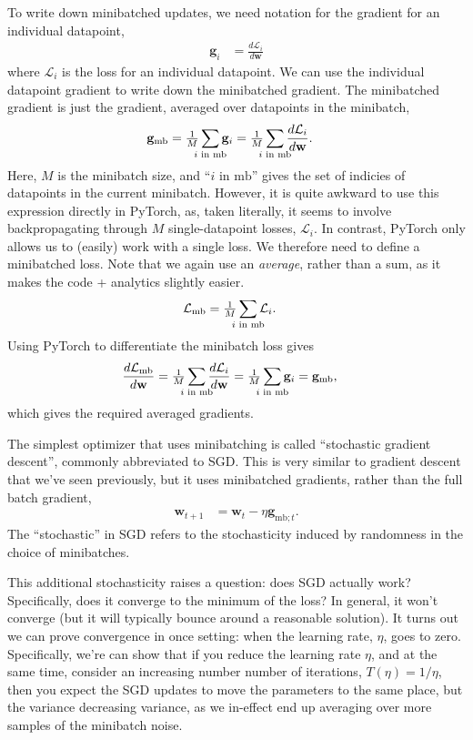 \documentclass{article}
\newcommand{\dt}[2][]{\frac{d #1}{d #2}}
\newcommand{\dLi}{\dt[{\Li}]}
\newcommand{\dLmb}{\dt[{\Lmb}]}
\newcommand{\0}{\mathbf{0}}
\newcommand{\g}{\mathbf{g}}
\newcommand{\gmb}{\g_\text{mb}}
\newcommand{\gmbt}{\g_{\text{mb}; t}}
\newcommand{\w}{\mathbf{w}}
\renewcommand{\L}{\mathcal{L}}
\newcommand{\Li}{\L_i}
\newcommand{\Lmb}{\L_\text{mb}}
\newcommand{\iinmb}{{i \text{ in mb}}}
\newcommand{\mbsize}{M}
\newcommand{\mbavg}{\tfrac{1}{\mbsize} \sum_{\mathclap{\iinmb}}}
\begin{document}
To write down minibatched updates, we need notation for the gradient for an individual datapoint,
\begin{align}
  \g_i &= \dLi{\w}
\end{align}
where $\Li$ is the loss for an individual datapoint.
We can use the individual datapoint gradient to write down the minibatched gradient. 
The minibatched gradient is just the gradient, averaged over datapoints in the minibatch,
\begin{align}
  \gmb &= \mbavg \g_i =  \mbavg \dLi{\w}.
\end{align}
Here, $\mbsize$ is the minibatch size, and ``$\iinmb$'' gives the set of indicies of datapoints in the current minibatch.
However, it is quite awkward to use this expression directly in PyTorch, as, taken literally, it seems to involve backpropagating through $M$ single-datapoint losses, $\Li$.
In contrast, PyTorch only allows us to (easily) work with a single loss.
We therefore need to define a minibatched loss.
Note that we again use an \textit{average}, rather than a sum, as it makes the code + analytics slightly easier.
\begin{align}
  \Lmb &= \mbavg \L_i.
\end{align}
Using PyTorch to differentiate the minibatch loss gives 
\begin{align}
  \dLmb{\w} &= \mbavg \dLi{\w} = \mbavg \g_i = \gmb,
\end{align}
which gives the required averaged gradients.

The simplest optimizer that uses minibatching is called ``stochastic gradient descent'', commonly abbreviated to SGD.
This is very similar to gradient descent that we've seen previously, but it uses minibatched gradients, rather than the full batch gradient,
\begin{align}
  \w_{t+1} &= \w_t - \eta \gmbt.
\end{align}
The ``stochastic'' in SGD refers to the stochasticity induced by randomness in the choice of minibatches.

This additional stochasticity raises a question: does SGD actually work?
Specifically, does it converge to the minimum of the loss?
In general, it won't converge (but it will typically bounce around a reasonable solution).
It turns out we can prove convergence in once setting: when the learning rate, $\eta$, goes to zero.
Specifically, we're can show that if you reduce the learning rate $\eta$, and at the same time, consider an increasing number number of iterations, $T(\eta) = 1/\eta$, then you expect the SGD updates to move the parameters to the same place, but the variance decreasing variance, as we in-effect end up averaging over more samples of the minibatch noise.
\end{document}
